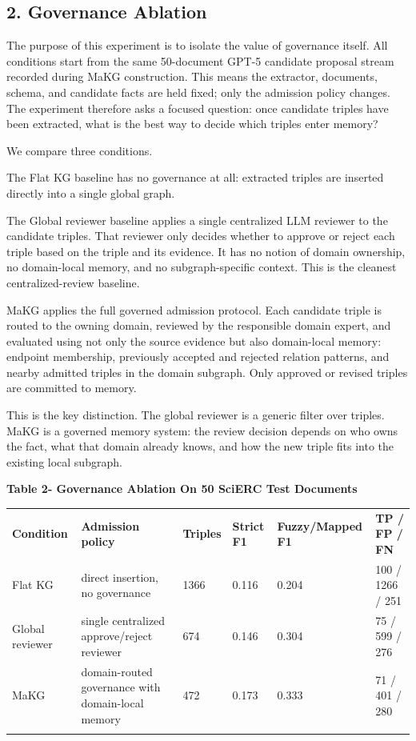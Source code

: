 \subsection{2. Governance Ablation}\label{governance-ablation}

The purpose of this experiment is to isolate the value of governance
itself. All conditions start from the same 50-document GPT-5 candidate
proposal stream recorded during MaKG construction. This means the
extractor, documents, schema, and candidate facts are held fixed; only
the admission policy changes. The experiment therefore asks a focused
question: once candidate triples have been extracted, what is the best
way to decide which triples enter memory?

We compare three conditions.

The Flat KG baseline has no governance at all: extracted triples are
inserted directly into a single global graph.

The Global reviewer baseline applies a single centralized LLM reviewer
to the candidate triples. That reviewer only decides whether to approve
or reject each triple based on the triple and its evidence. It has no
notion of domain ownership, no domain-local memory, and no
subgraph-specific context. This is the cleanest centralized-review
baseline.

MaKG applies the full governed admission protocol. Each candidate triple
is routed to the owning domain, reviewed by the responsible domain
expert, and evaluated using not only the source evidence but also
domain-local memory: endpoint membership, previously accepted and
rejected relation patterns, and nearby admitted triples in the domain
subgraph. Only approved or revised triples are committed to memory.

This is the key distinction. The global reviewer is a generic filter
over triples. MaKG is a governed memory system: the review decision
depends on who owns the fact, what that domain already knows, and how
the new triple fits into the existing local subgraph.

\textbf{Table 2- Governance Ablation On 50 SciERC Test Documents}

{\def\LTcaptype{none} %
\begin{longtable}[]{@{}llllll@{}}
\toprule\noalign{}
\textbf{Condition} & \textbf{Admission policy} & \textbf{Triples} &
\textbf{Strict F1} & \textbf{Fuzzy/Mapped F1} & \textbf{TP / FP / FN} \\
Flat KG & direct insertion, no governance & 1366 & 0.116 & 0.204 & 100 /
1266 / 251 \\
Global reviewer & single centralized approve/reject reviewer & 674 &
0.146 & 0.304 & 75 / 599 / 276 \\
MaKG & domain-routed governance with domain-local memory & 472 & 0.173 &
0.333 & 71 / 401 / 280 \\
\midrule\noalign{}
\endhead
\bottomrule\noalign{}
\endlastfoot
\end{longtable}
}

